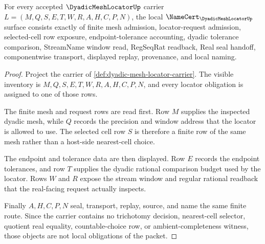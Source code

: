 \begin{theorem}
\label{thm:dyadic-mesh-locator-namecert-obligations}
For every accepted $\DyadicMeshLocatorUp$ carrier $L=(M,Q,S,E,T,W,R,A,H,C,P,N)$, the local $\NameCert_{\DyadicMeshLocatorUp}$ surface consists exactly of finite mesh admission, locator-request admission, selected-cell row exposure, endpoint-tolerance accounting, dyadic tolerance comparison, StreamName window read, RegSeqRat readback, Real seal handoff, componentwise transport, displayed replay, provenance, and local naming.
\end{theorem}
\begin{proof}
Project the carrier of \autoref{def:dyadic-mesh-locator-carrier}. The visible inventory is $M,Q,S,E,T,W,R,A,H,C,P,N$, and every locator obligation is assigned to one of those rows.

The finite mesh and request rows are read first. Row $M$ supplies the inspected dyadic mesh, while $Q$ records the precision and window address that the locator is allowed to use. The selected cell row $S$ is therefore a finite row of the same mesh rather than a host-side nearest-cell choice.

The endpoint and tolerance data are then displayed. Row $E$ records the endpoint tolerances, and row $T$ supplies the dyadic rational comparison budget used by the locator. Rows $W$ and $R$ expose the stream window and regular rational readback that the real-facing request actually inspects.

Finally $A,H,C,P,N$ seal, transport, replay, source, and name the same finite route. Since the carrier contains no trichotomy decision, nearest-cell selector, quotient real equality, countable-choice row, or ambient-completeness witness, those objects are not local obligations of the packet.
\end{proof}


